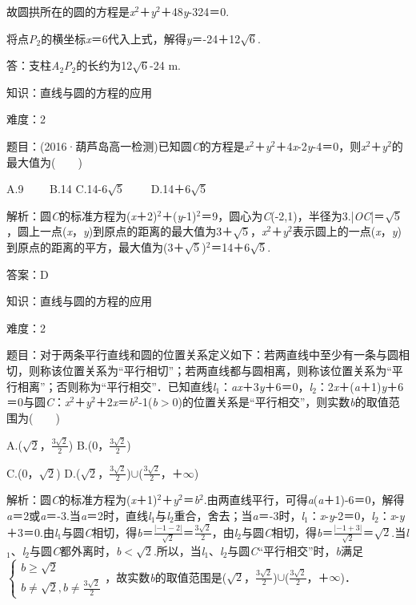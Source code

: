 \documentclass{article} %
\begin{document}
故圆拱所在的圆的方程是\textit{x}${}^{2}$＋\textit{y}${}^{2}$＋48\textit{y}-324＝0.

将点\textit{P}${}_{2}$的横坐标\textit{x}＝6代入上式，解得\textit{y}＝-24＋12$\sqrt{6}$.

答：支柱\textit{A}${}_{2}$\textit{P}${}_{2}$的长约为12$\sqrt{6}$-24 m.

知识：直线与圆的方程的应用

难度：2

题目：(2016·葫芦岛高一检测)已知圆\textit{C}的方程是\textit{x}${}^{2}$＋\textit{y}${}^{2}$＋4\textit{x}-2\textit{y}-4＝0，则\textit{x}${}^{2}$＋\textit{y}${}^{2}$的最大值为(　　)

A.9　　 B.14 C.14-6$\sqrt{5}$　　 D.14＋6$\sqrt{5}$

解析：圆\textit{C}的标准方程为(\textit{x}＋2)${}^{2}$＋(\textit{y}-1)${}^{2}$＝9，圆心为\textit{C}(-2,1)，半径为3.|\textit{OC}|＝$\sqrt{5}$，圆上一点(\textit{x}，\textit{y})到原点的距离的最大值为3＋$\sqrt{5}$，\textit{x}${}^{2}$＋\textit{y}${}^{2}$表示圆上的一点(\textit{x}，\textit{y})到原点的距离的平方，最大值为(3＋$\sqrt{5}$)${}^{2}$＝14＋6$\sqrt{5}$.

答案：D

知识：直线与圆的方程的应用

难度：2

题目：对于两条平行直线和圆的位置关系定义如下：若两直线中至少有一条与圆相切，则称该位置关系为``平行相切''；若两直线都与圆相离，则称该位置关系为``平行相离''；否则称为``平行相交''．已知直线\textit{l}${}_{1}$：\textit{ax}＋3\textit{y}＋6＝0，\textit{l}${}_{2}$：2\textit{x}＋(\textit{a}＋1)\textit{y}＋6＝0与圆\textit{C}：\textit{x}${}^{2}$＋\textit{y}${}^{2}$＋2\textit{x}＝\textit{b}${}^{2}$-1(\textit{b}$\mathrm{>}$0)的位置关系是``平行相交''，则实数\textit{b}的取值范围为(　　)

A.($\sqrt{2}$，$\frac{3\sqrt{2}}{2}$)  B.(0，$\frac{3\sqrt{2}}{2}$)

C.(0，$\sqrt{2}$)  D.($\sqrt{2}$，$\frac{3\sqrt{2}}{2}$)$\mathrm{\cup}$($\frac{3\sqrt{2}}{2}$，＋$\mathrm{\infty}$)

解析：圆\textit{C}的标准方程为(\textit{x}＋1)${}^{2}$＋\textit{y}${}^{2}$＝\textit{b}${}^{2}$.由两直线平行，可得\textit{a}(\textit{a}＋1)-6＝0，解得\textit{a}＝2或\textit{a}＝-3.当\textit{a}＝2时，直线\textit{l}${}_{1}$与\textit{l}${}_{2}$重合，舍去；当\textit{a}＝-3时，\textit{l}${}_{1}$：\textit{x}-\textit{y}-2＝0，\textit{l}${}_{2}$：\textit{x}-\textit{y}＋3＝0.由\textit{l}${}_{1}$与圆\textit{C}相切，得\textit{b}＝$\frac{|-1-2|}{\sqrt{2}}$＝$\frac{3\sqrt{2}}{2}$，由\textit{l}${}_{2}$与圆\textit{C}相切，得\textit{b}＝$\frac{|-1+3|}{\sqrt{2}}$＝$\sqrt{2}$.当\textit{l}${}_{1}$、\textit{l}${}_{2}$与圆\textit{C}都外离时，\textit{b}$\mathrm{<}$$\sqrt{2}$.所以，当\textit{l}${}_{1}$、\textit{l}${}_{2}$与圆\textit{C}``平行相交''时，\textit{b}满足$\left\{\begin{array}{r} b\ge \sqrt{2}\\ b\ne \sqrt{2},b\ne \frac{3\sqrt{2}}{2} \end{array} \right.$，故实数\textit{b}的取值范围是($\sqrt{2}$，$\frac{3\sqrt{2}}{2}$)$\mathrm{\cup}$($\frac{3\sqrt{2}}{2}$，＋$\mathrm{\infty}$)．
\end{document}
